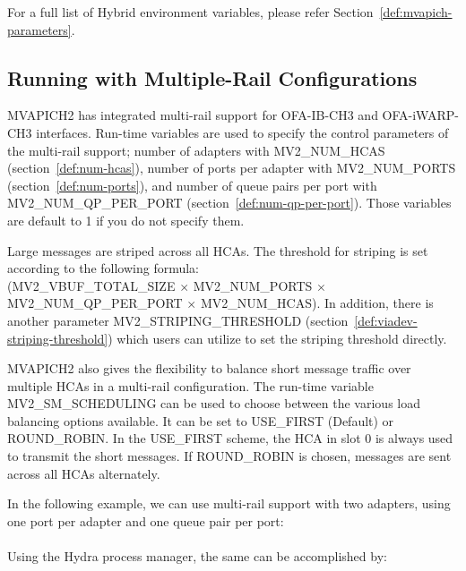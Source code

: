 For a full list of Hybrid environment variables, please refer Section~\ref{def:mvapich-parameters}.

\subsection{Running with Multiple-Rail Configurations}
\label{subsec:mpi-mr}

MVAPICH2 has integrated multi-rail support for OFA-IB-CH3 and
OFA-iWARP-CH3 interfaces. Run-time variables are used to specify the
control parameters of the multi-rail support; number of adapters with
MV2\_NUM\_HCAS (section~\ref{def:num-hcas}), number of ports per adapter
with MV2\_NUM\_PORTS (section~\ref{def:num-ports}), and number of queue
pairs per port with MV2\_NUM\_QP\_PER\_PORT
(section~\ref{def:num-qp-per-port}). Those variables are default to 1 if
you do not specify them.

Large messages are striped across all HCAs. The threshold for striping
is set according to the following formula: \\
(MV2\_VBUF\_TOTAL\_SIZE $\times$ MV2\_NUM\_PORTS $\times$
MV2\_NUM\_QP\_PER\_PORT $\times$
MV2\_NUM\_HCAS). In addition, there is another parameter
MV2\_STRIPING\_THRESHOLD (section~\ref{def:viadev-striping-threshold}) which users can
utilize to set the striping threshold directly.

MVAPICH2 also gives the flexibility to balance short message traffic over
multiple HCAs in a multi-rail configuration. The run-time variable
MV2\_SM\_SCHEDULING can be used to choose between the various load balancing
options available. It can be set to USE\_FIRST (Default) or ROUND\_ROBIN. In
the USE\_FIRST scheme, the HCA in slot 0 is always used to transmit
the short messages. If ROUND\_ROBIN is chosen, messages are sent across all
HCAs alternately.

In the following example, we can use multi-rail support with two
adapters, using one port per adapter and one queue pair per port:\\

\\

Using the Hydra process manager, the same can be accomplished by:\\

\\
\\


